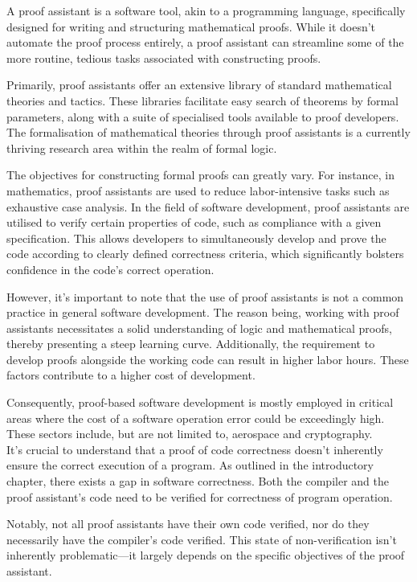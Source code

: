 A proof assistant is a software tool, akin to a programming language, specifically designed for writing and structuring mathematical proofs. While it doesn't automate the proof process entirely, a proof assistant can streamline some of the more routine, tedious tasks associated with constructing proofs.

Primarily, proof assistants offer an extensive library of standard mathematical theories and tactics. These libraries facilitate easy search of theorems by formal parameters, along with a suite of specialised tools available to proof developers. The formalisation of mathematical theories through proof assistants is a currently thriving research area within the realm of formal logic.

The objectives for constructing formal proofs can greatly vary. For instance, in mathematics, proof assistants are used to reduce labor-intensive tasks such as exhaustive case analysis. In the field of software development, proof assistants are utilised to verify certain properties of code, such as compliance with a given specification. This allows developers to simultaneously develop and prove the code according to clearly defined correctness criteria, which significantly bolsters confidence in the code's correct operation.

However, it's important to note that the use of proof assistants is not a common practice in general software development. The reason being, working with proof assistants necessitates a solid understanding of logic and mathematical proofs, thereby presenting a steep learning curve. Additionally, the requirement to develop proofs alongside the working code can result in higher labor hours. These factors contribute to a higher cost of development.

Consequently, proof-based software development is mostly employed in critical areas where the cost of a software operation error could be exceedingly high. These sectors include, but are not limited to, aerospace and cryptography.\\

It's crucial to understand that a proof of code correctness doesn't inherently ensure the correct execution of a program. As outlined in the introductory chapter, there exists a gap in software correctness. Both the compiler and the proof assistant's code need to be verified for correctness of program operation.

Notably, not all proof assistants have their own code verified, nor do they necessarily have the compiler's code verified. This state of non-verification isn't inherently problematic—it largely depends on the specific objectives of the proof assistant.


